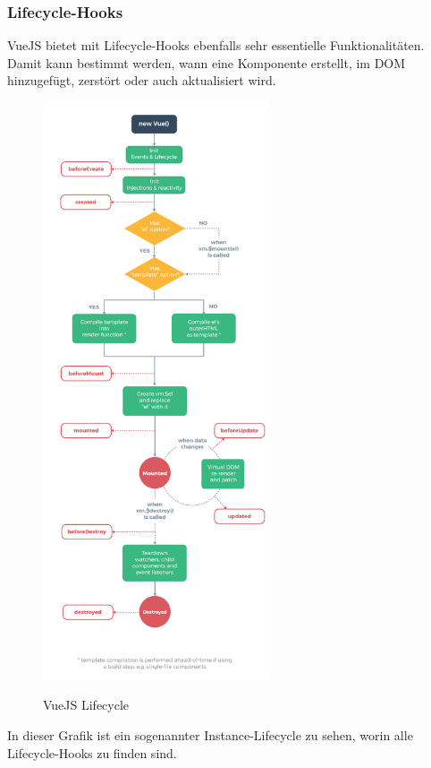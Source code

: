 \subsubsection{Lifecycle-Hooks}
VueJS bietet mit Lifecycle-Hooks ebenfalls sehr essentielle Funktionalitäten. Damit kann bestimmt werden, wann eine Komponente erstellt, im DOM hinzugefügt, zerstört oder auch aktualisiert wird. 
\newpage
\begin{figure}[h!]
    \centering
    \includegraphics[width=0.6\textwidth]{pics/vuejs-lifecycle.png}
    \caption{VueJS Lifecycle}
    \cite{frontend_web_vuejs_lifecycle}
    \label{fig:mesh1}
\end{figure}

In dieser Grafik ist ein sogenannter Instance-Lifecycle zu sehen, worin alle Lifecycle-Hooks zu finden sind.
\cite{frontend_web_vuejs_lifecycle}

